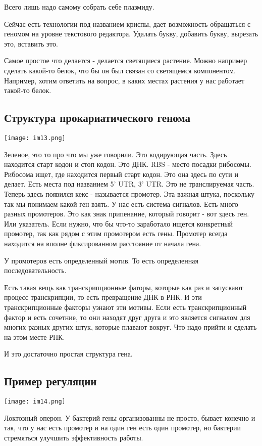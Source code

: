 Всего лишь надо самому собрать себе плазмиду.

Сейчас есть технологии под названием криспы, дает
возможность обращаться с геномом на уровне текстового редактора.
Удалать букву, добавить букву, вырезать это,
вставить это.

Самое простое что делается - делается
светящиеся растение. Можно например сделать
какой-то белок, что бы он был связан со светящемся
компонентом. Например, хотим
ответить на вопрос, в каких местах
растения у нас работает такой-то белок.


\subsection{Структура прокариатического генома}   
\texttt{[image: im13.png]}

Зеленое, это то про что 
мы уже говорили. Это кодирующая часть. Здесь 
находится старт кодон и стоп кодон. 
Это ДНК. RBS - место посадки рибосомы. Рибосома 
ищет, где находится первый старт кодон. Это она здесь по 
сути и делает. Есть места под
названием 5' UTR, 3' UTR. Это не транслируемая часть. 
Теперь здесь появился кекс - называется промотер. Эта 
важная штука, поскольку так мы понимаем какой ген взять. 
У нас есть система сигналов. Есть много разных 
промотеров. Это как знак припенание, который говорит - вот 
здесь ген. Или указатель. Если нужно, что бы 
что-то заработало ищется конкретный промотер, так
как рядом с этим промотером есть гены. Промотер 
всегда находится на вполне фиксированном расстояние от начала гена. 

У промотеров есть определенный мотив. То есть определенная последовательность. 

Есть такая вещь как транскрипционные фаторы, которые как раз и запускают 
процесс транскрипции, то есть превращение ДНК в РНК. И эти транскрипционные 
факторы узнают эти мотивы. Если есть транскрипционный фактор и
есть сочетние, то они находят друг друга и это является сигналом для многих
разных других штук,
которые плавают вокруг. Что надо прийти и сделать на этом месте РНК.

И это достаточно простая структура гена.  

\subsection{Пример регуляции}
\texttt{[image: im14.png]}

Локтозный оперон. У бактерий гены организованны не просто, 
бывает конечно и так, что у нас есть промотер и на один ген есть
один промотер, но бактерии стремяться улучшить эффективность работы.

